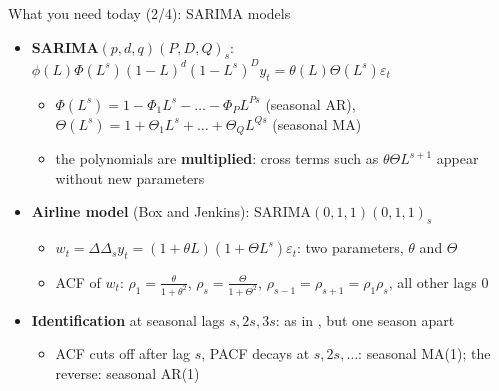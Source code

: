\begin{frame}{What you need today (2/4): SARIMA models}
\itemsize{\small}
\begin{itemize}
    \item \textbf{SARIMA$(p,d,q)(P,D,Q)_s$}: $\phi(L)\Phi(L^s)(1 - L)^d(1 - L^s)^D y_t = \theta(L)\Theta(L^s)\varepsilon_t$
    \begin{itemize}
        \item $\Phi(L^s) = 1 - \Phi_1L^s - \dots - \Phi_PL^{Ps}$ (seasonal AR), $\Theta(L^s) = 1 + \Theta_1L^s + \dots + \Theta_QL^{Qs}$ (seasonal MA)
        \item the polynomials are \textbf{multiplied}: cross terms such as $\theta\Theta L^{s+1}$ appear without new parameters
    \end{itemize}
    \item \textbf{Airline model} (Box and Jenkins): SARIMA$(0,1,1)(0,1,1)_s$
    \begin{itemize}
        \item $w_t = \Delta\Delta_s y_t = (1 + \theta L)(1 + \Theta L^s)\varepsilon_t$: two parameters, $\theta$ and $\Theta$
        \item ACF of $w_t$: $\rho_1 = \frac{\theta}{1 + \theta^2}$, $\rho_s = \frac{\Theta}{1 + \Theta^2}$, $\rho_{s-1} = \rho_{s+1} = \rho_1\rho_s$, all other lags 0
    \end{itemize}
    \item \textbf{Identification} at seasonal lags $s, 2s, 3s$: as in , but one season apart
    \begin{itemize}
        \item ACF cuts off after lag $s$, PACF decays at $s, 2s, \dots$: seasonal MA(1); the reverse: seasonal AR(1)
    \end{itemize}
\end{itemize}
\end{frame}

